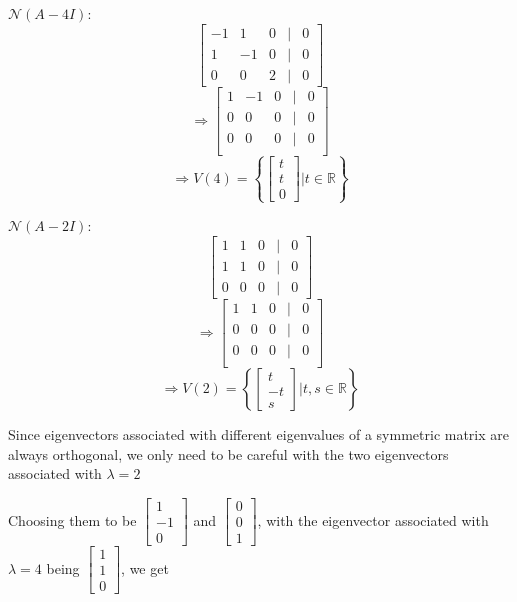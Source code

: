 \documentclass{article}
\begin{document}
\(\mathcal{N}(A-4I)\):
\[
\begin{bmatrix}
    -1 & 1 & 0 & | & 0 \\
    1 & -1 & 0 & | & 0 \\
    0 & 0 & 2 & | & 0 
\end{bmatrix}
\]
\[
\Rightarrow \begin{bmatrix}
    1 & -1 & 0 & | & 0 \\
    0 & 0 & 0 & | & 0 \\
    0 & 0 & 0 & | & 0 \\
\end{bmatrix}
\]
\[
\Rightarrow V(4) = \left\{ \begin{bmatrix}
t \\ t \\ 0
\end{bmatrix} | t \in \mathbb{R}  \right\}
\]

\(\mathcal{N}(A-2I)\):
\[
\begin{bmatrix}
    1 & 1 & 0 & | & 0 \\
    1 & 1 & 0 & | & 0 \\
    0 & 0 & 0 & | & 0 
\end{bmatrix}
\]
\[
\Rightarrow \begin{bmatrix}
    1 & 1 & 0 & | & 0 \\
    0 & 0 & 0 & | & 0 \\
    0 & 0 & 0 & | & 0 \\
\end{bmatrix}
\]
\[
\Rightarrow V(2) = \left\{ \begin{bmatrix}
t \\ -t \\ s
\end{bmatrix} | t,s \in \mathbb{R}  \right\}
\]

Since eigenvectors associated with different eigenvalues of a symmetric matrix are always
orthogonal, we only need to be careful with the two eigenvectors associated with \(\lambda = 2\)

Choosing them to be \(\begin{bmatrix}
    1 \\ -1 \\ 0
\end{bmatrix}\) and \(\begin{bmatrix}
    0 \\ 0 \\ 1
\end{bmatrix}\), with the eigenvector associated with \(\lambda = 4 \) being \(\begin{bmatrix}
    1 \\ 1 \\ 0
\end{bmatrix}\), we get 
\end{document}
